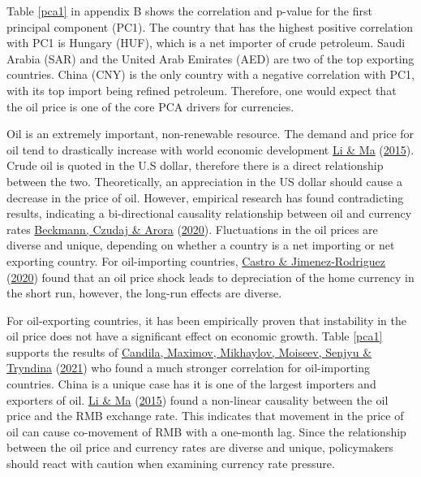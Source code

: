 \documentclass[11pt,preprint, authoryear]{elsarticle}
\numberwithin{equation}{section}
\numberwithin{figure}{section}
\numberwithin{table}{section}
\begin{document}
Table \ref{pca1} in appendix B shows the correlation and p-value for the
first principal component (PC1). The country that has the highest
positive correlation with PC1 is Hungary (HUF), which is a net importer
of crude petroleum. Saudi Arabia (SAR) and the United Arab Emirates
(AED) are two of the top exporting countries. China (CNY) is the only
country with a negative correlation with PC1, with its top import being
refined petroleum. Therefore, one would expect that the oil price is one
of the core PCA drivers for currencies.

Oil is an extremely important, non-renewable resource. The demand and
price for oil tend to drastically increase with world economic
development \protect\hyperlink{ref-li2015}{Li \& Ma}
(\protect\hyperlink{ref-li2015}{2015}). Crude oil is quoted in the U.S
dollar, therefore there is a direct relationship between the two.
Theoretically, an appreciation in the US dollar should cause a decrease
in the price of oil. However, empirical research has found contradicting
results, indicating a bi-directional causality relationship between oil
and currency rates \protect\hyperlink{ref-beck2020}{Beckmann, Czudaj \&
Arora} (\protect\hyperlink{ref-beck2020}{2020}). Fluctuations in the oil
prices are diverse and unique, depending on whether a country is a net
importing or net exporting country. For oil-importing countries,
\protect\hyperlink{ref-castro}{Castro \& Jimenez-Rodriguez}
(\protect\hyperlink{ref-castro}{2020}) found that an oil price shock
leads to depreciation of the home currency in the short run, however,
the long-run effects are diverse.

For oil-exporting countries, it has been empirically proven that
instability in the oil price does not have a significant effect on
economic growth. Table \ref{pca1} supports the results of
\protect\hyperlink{ref-can2021}{Candila, Maximov, Mikhaylov, Moiseev,
Senjyu \& Tryndina} (\protect\hyperlink{ref-can2021}{2021}) who found a
much stronger correlation for oil-importing countries. China is a unique
case has it is one of the largest importers and exporters of oil.
\protect\hyperlink{ref-li2015}{Li \& Ma}
(\protect\hyperlink{ref-li2015}{2015}) found a non-linear causality
between the oil price and the RMB exchange rate. This indicates that
movement in the price of oil can cause co-movement of RMB with a
one-month lag. Since the relationship between the oil price and currency
rates are diverse and unique, policymakers should react with caution
when examining currency rate pressure.
\end{document}
